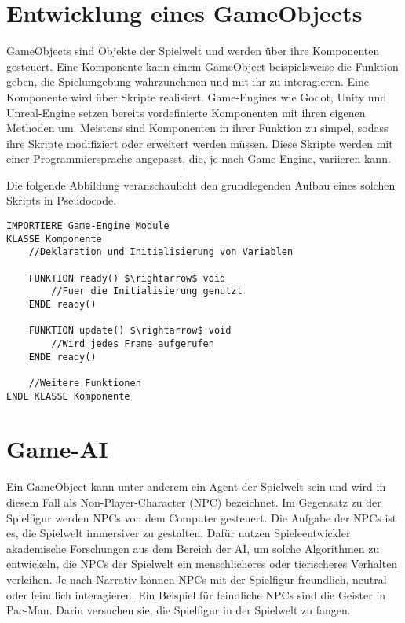 \section{Entwicklung eines GameObjects}
\label{chap:komponenten}

GameObjects sind Objekte der Spielwelt und werden \"{u}ber ihre Komponenten gesteuert. Eine Komponente kann einem GameObject beispielsweise die Funktion geben, die Spielumgebung wahrzunehmen und mit ihr zu interagieren. Eine Komponente wird \"{u}ber Skripte realisiert. Game-Engines wie Godot, Unity und Unreal-Engine setzen bereits vordefinierte Komponenten mit ihren eigenen Methoden um. Meistens sind Komponenten in ihrer Funktion zu simpel, sodass ihre Skripte modifiziert oder erweitert werden m\"{u}ssen. Diese Skripte werden mit einer Programmiersprache angepasst, die, je nach Game-Engine, variieren kann.

Die folgende Abbildung veranschaulicht den grundlegenden Aufbau eines solchen Skripts in Pseudocode.

\begin{lstlisting}[language=Pseudo, caption={Aufbau eines Komponenten Skripts}, mathescape=true]
IMPORTIERE Game-Engine Module
KLASSE Komponente
	//Deklaration und Initialisierung von Variablen
	
	FUNKTION ready() $\rightarrow$ void
		//Fuer die Initialisierung genutzt
	ENDE ready()

	FUNKTION update() $\rightarrow$ void
		//Wird jedes Frame aufgerufen
	ENDE ready()
	
	//Weitere Funktionen
ENDE KLASSE Komponente

\end{lstlisting}

\section{Game-AI}
\label{chap:game-ai}

Ein GameObject kann unter anderem ein Agent der Spielwelt sein und wird in diesem Fall als Non-Player-Character (NPC) bezeichnet. Im Gegensatz zu der Spielfigur werden NPCs von dem Computer gesteuert. Die Aufgabe der NPCs ist es, die Spielwelt immersiver zu gestalten. Daf\"{u}r nutzen Spieleentwickler akademische Forschungen aus dem Bereich der AI, um solche Algorithmen zu entwickeln, die NPCs der Spielwelt ein menschlicheres oder tierischeres Verhalten verleihen. Je nach Narrativ k\"{o}nnen NPCs mit der Spielfigur freundlich, neutral oder feindlich interagieren. Ein Beispiel f\"{u}r feindliche NPCs sind die Geister in Pac-Man. Darin versuchen sie, die Spielfigur in der Spielwelt zu fangen.


